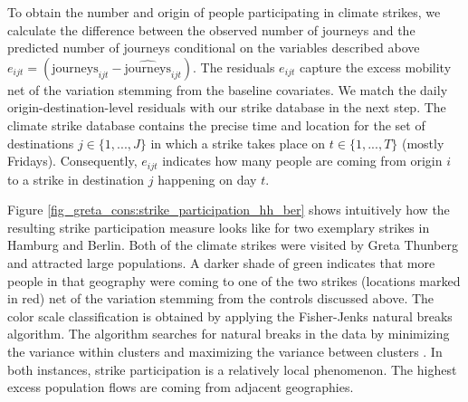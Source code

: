 To obtain the number and origin of people participating in climate strikes, we calculate the difference between the observed number of journeys and the predicted number of journeys conditional on the variables described above $e_{ijt} =(\text{journeys}_{ijt} - \widehat{\text{journeys}}_{ijt})$. The residuals $e_{ijt}$ capture the excess mobility net of the variation stemming from the baseline covariates. We match the daily origin-destination-level residuals with our strike database in the next step. The climate strike database contains the precise time and location for the set of destinations $j\in\{1,...,J\}$ in which a strike takes place on $t\in\{1,...,T\}$ (mostly Fridays). Consequently, $e_{ijt}$ indicates how many people are coming from origin $i$ to a strike in destination $j$ happening on day $t$. 


Figure \ref{fig_greta_cons:strike_participation_hh_ber} shows intuitively how the resulting strike participation measure looks like for two exemplary strikes in Hamburg and Berlin. Both of the climate strikes were visited by Greta Thunberg and attracted large populations. A darker shade of green indicates that more people in that geography were coming to one of the two strikes (locations marked in red) net of the variation stemming from the controls discussed above. The color scale classification is obtained by applying the Fisher-Jenks natural breaks algorithm. The algorithm searches for natural breaks in the data by minimizing the variance within clusters and maximizing the variance between clusters \citep{jenks1967data}. In both instances, strike participation is a relatively local phenomenon. The highest excess population flows are coming from adjacent geographies.





